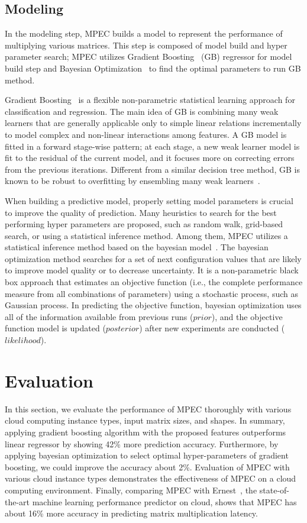 \documentclass[10pt, conference, compsocconf]{IEEEtran}
\begin{document}
\subsection{Modeling}\label{sec:modeling}
In the modeling step, MPEC builds a model to represent the performance of multiplying various matrices. This step is composed of model build and hyper parameter search; MPEC utilizes Gradient Boosting~\cite{gradient-boosting} (GB) regressor for model build step and Bayesian Optimization~\cite{bayesian-optimization} to find the optimal parameters to run GB method.

Gradient Boosting~\cite{gradient-boosting} is a flexible non-parametric statistical learning approach for classification and regression. The main idea of GB is combining many weak learners that are generally applicable only to simple linear relations incrementally to model complex and non-linear interactions among features. A GB model is fitted in a forward stage-wise pattern; at each stage, a new weak learner model is fit to the residual of the current model, and it focuses more on correcting errors from the previous iterations. Different from a similar decision tree method, GB is known to be robust to overfitting by ensembling many weak learners~\cite{random-forest}.

When building a predictive model, properly setting model parameters is crucial to improve the quality of prediction. Many heuristics to search for the best performing hyper parameters are proposed, such as random walk, grid-based search, or using a statistical inference method. Among them, MPEC utilizes a statistical inference method based on the bayesian model~\cite{bayesian-optimization}. The bayesian optimization method searches for a set of next configuration values that are likely to improve model quality or to decrease uncertainty. It is a non-parametric black box approach that estimates an objective function (i.e., the complete performance measure from all combinations of parameters) using a stochastic process, such as Gaussian process. In predicting the objective function, bayesian optimization uses all of the information available from previous runs ($prior$), and the objective function model is updated ($posterior$) after new experiments are conducted ($likelihood$).

\section{Evaluation}{\label{sec:eval}}
In this section, we evaluate the performance of MPEC thoroughly with various cloud computing instance types, input matrix sizes, and shapes. In summary, applying gradient boosting algorithm with the proposed features outperforms linear regressor by showing 42\% more prediction accuracy. Furthermore, by applying bayesian optimization to select optimal hyper-parameters of gradient boosting, we could improve the accuracy about 2\%. Evaluation of MPEC with various cloud instance types demonstrates the effectiveness of MPEC on a cloud computing environment. Finally, comparing MPEC with Ernest~\cite{ernest}, the state-of-the-art machine learning performance predictor on cloud, shows that MPEC has about 16\% more accuracy in predicting matrix multiplication latency.
\end{document}
